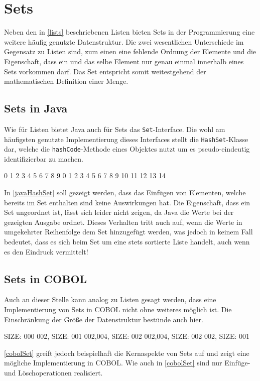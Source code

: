 \section{Sets}
Neben den in \autoref{lists} beschriebenen Listen bieten Sets in der Programmierung eine weitere häufig genutzte Datenstruktur. Die zwei wesentlichen Unterschiede im Gegensatz zu Listen sind, zum einen eine fehlende Ordnung der Elemente und die Eigenschaft, dass ein und das selbe Element nur genau einmal innerhalb eines Sets vorkommen darf. Das Set entspricht somit weitestgehend der mathematischen Definition einer Menge.\\

\subsection*{Sets in Java}
Wie für Listen bietet Java auch für Sets das \texttt{Set}-Interface. Die wohl am häufigsten genutzte Implementierung dieses Interfaces stellt die \texttt{HashSet}-Klasse dar, welche die \texttt{hashCode}-Methode eines Objektes nutzt um es pseudo-eindeutig identifizierbar zu machen.\\

\begin{shellwindow}
0 1 2 3 4 5 6 7 8 9 
0 1 2 3 4 5 6 7 8 9 10 11 12 13 14 
\end{shellwindow}

In \autoref{javaHashSet} soll gezeigt werden, dass das Einfügen von Elementen, welche bereits im Set enthalten sind keine Auswirkungen hat. Die Eigenschaft, dass ein Set ungeordnet ist, lässt sich leider nicht zeigen, da Java die Werte bei der gezeigten Ausgabe ordnet. Dieses Verhalten tritt auch auf, wenn die Werte in umgekehrter Reihenfolge dem Set hinzugefügt werden, was jedoch in keinem Fall bedeutet, dass es sich beim Set um eine stets sortierte Liste handelt, auch wenn es den Eindruck vermittelt!\\

\subsection*{Sets in COBOL}
Auch an dieser Stelle kann analog zu Listen gesagt werden, dass eine Implementierung von Sets in COBOL nicht ohne weiteres möglich ist. Die Einschränkung der Größe der Datenstruktur bestünde auch hier. 

\begin{shellwindow}
 SIZE: 000
002, SIZE: 001
002,004, SIZE: 002
002,004, SIZE: 002
002, SIZE: 001
\end{shellwindow}

\autoref{cobolSet} greift jedoch beispielhaft die Kernaspekte von Sets auf und zeigt eine mögliche Implementierung in COBOL. Wie auch in \autoref{cobolSet} sind nur Einfüge- und Löschoperationen realisiert.